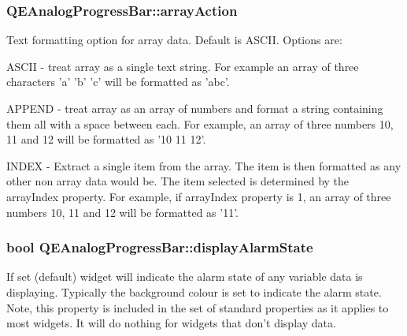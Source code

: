 \hypertarget{classQEAnalogProgressBar_ac25da924e9ce550248e31d83516bf4ff}{
\subsubsection[{arrayAction}]{ QEAnalogProgressBar::arrayAction}}
\label{classQEAnalogProgressBar_ac25da924e9ce550248e31d83516bf4ff}
Text formatting option for array data. Default is ASCII. Options are: \begin{DoxyItemize}
\item ASCII -\/ treat array as a single text string. For example an array of three characters 'a' 'b' 'c' will be formatted as 'abc'. \item APPEND -\/ treat array as an array of numbers and format a string containing them all with a space between each. For example, an array of three numbers 10, 11 and 12 will be formatted as '10 11 12'. \item INDEX -\/ Extract a single item from the array. The item is then formatted as any other non array data would be. The item selected is determined by the arrayIndex property. For example, if arrayIndex property is 1, an array of three numbers 10, 11 and 12 will be formatted as '11'. \end{DoxyItemize}
\hypertarget{classQEAnalogProgressBar_a251e3abc3ab482f04e085e693c5ff5e8}{
\subsubsection[{displayAlarmState}]{\setlength{\rightskip}{0pt plus 5cm}bool QEAnalogProgressBar::displayAlarmState}}
\label{classQEAnalogProgressBar_a251e3abc3ab482f04e085e693c5ff5e8}
If set (default) widget will indicate the alarm state of any variable data is displaying. Typically the background colour is set to indicate the alarm state. Note, this property is included in the set of standard properties as it applies to most widgets. It will do nothing for widgets that don't display data. 

